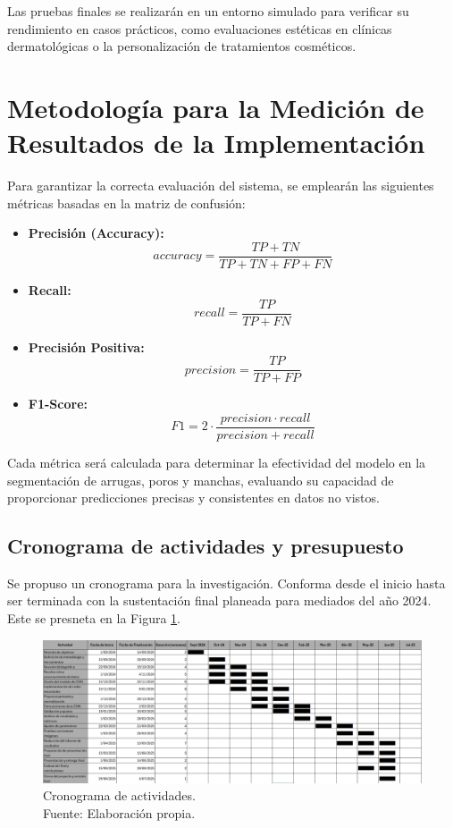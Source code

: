 Las pruebas finales se realizarán en un entorno simulado para verificar su rendimiento en casos prácticos, como evaluaciones estéticas en clínicas dermatológicas o la personalización de tratamientos cosméticos.

\section{Metodología para la Medición de Resultados de la Implementación}

Para garantizar la correcta evaluación del sistema, se emplearán las siguientes métricas basadas en la matriz de confusión:
\begin{itemize}
    \item \textbf{Precisión (Accuracy):} \[ accuracy = \frac{TP + TN}{TP + TN + FP + FN} \]
    \item \textbf{Recall:} \[ recall = \frac{TP}{TP + FN} \]
    \item \textbf{Precisión Positiva:} \[ precision = \frac{TP}{TP + FP} \]
    \item \textbf{F1-Score:} \[ F1 = 2 \cdot \frac{precision \cdot recall}{precision + recall} \]
\end{itemize}

Cada métrica será calculada para determinar la efectividad del modelo en la segmentación de arrugas, poros y manchas, evaluando su capacidad de proporcionar predicciones precisas y consistentes en datos no vistos.

\begin{landscape}
	\section{Cronograma de actividades y presupuesto}
	Se propuso un cronograma para la investigación. Conforma desde el inicio hasta ser terminada con la sustentación final planeada para mediados del año 2024. Este se presneta en la Figura \ref{3:fig303}.

	\begin{figure}[!ht]
		\begin{center}
			\includegraphics[width=1.50\textwidth]{3/figures/gant.png}
			\caption[Cronograma de actividades]{Cronograma de actividades.\\
				Fuente: Elaboración propia.}
			\label{3:fig303}
		\end{center}
	\end{figure}
	
\end{landscape}

